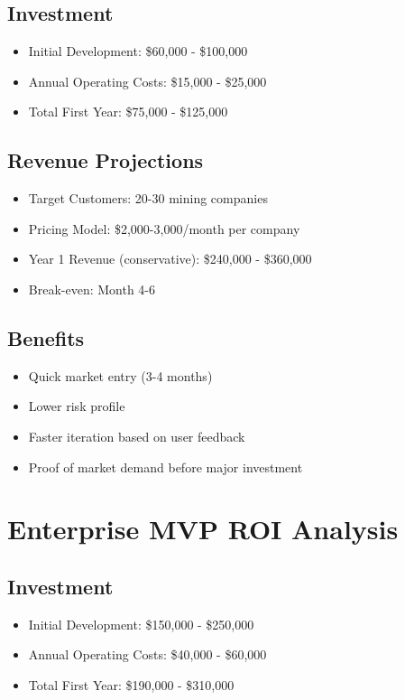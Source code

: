 \documentclass[12pt,a4paper]{report}
\begin{document}
\subsection{Investment}
\begin{itemize}
    \item Initial Development: \$60,000 - \$100,000
    \item Annual Operating Costs: \$15,000 - \$25,000
    \item Total First Year: \$75,000 - \$125,000
\end{itemize}

\subsection{Revenue Projections}
\begin{itemize}
    \item Target Customers: 20-30 mining companies
    \item Pricing Model: \$2,000-3,000/month per company
    \item Year 1 Revenue (conservative): \$240,000 - \$360,000
    \item Break-even: Month 4-6
\end{itemize}

\subsection{Benefits}
\begin{itemize}
    \item Quick market entry (3-4 months)
    \item Lower risk profile
    \item Faster iteration based on user feedback
    \item Proof of market demand before major investment
\end{itemize}

\section{Enterprise MVP ROI Analysis}

\subsection{Investment}
\begin{itemize}
    \item Initial Development: \$150,000 - \$250,000
    \item Annual Operating Costs: \$40,000 - \$60,000
    \item Total First Year: \$190,000 - \$310,000
\end{itemize}
\end{document}
